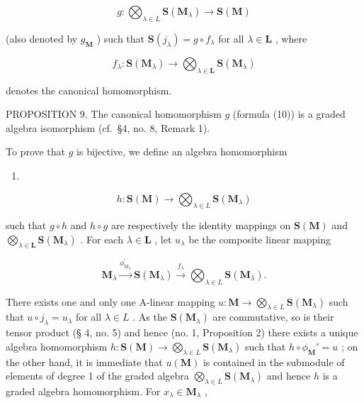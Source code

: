 \[
g \colon \bigotimes_ {\lambda \in L} \mathbf {S} (\mathbf {M} _ {\lambda}) \rightarrow \mathbf {S} (\mathbf {M})\tag{10}
\]

(also denoted by \(g_{\mathbf{M}}\) ) such that \(\mathbf{S}(j_{\lambda}) = g \circ f_{\lambda}\) for all \(\lambda \in \mathbf{L}\) , where

\[
f _ {\lambda} \colon \mathbf {S} (\mathbf {M} _ {\lambda}) \rightarrow \bigotimes_ {\lambda \in \mathbf {L}} \mathbf {S} (\mathbf {M} _ {\lambda})
\]

denotes the canonical homomorphism.

PROPOSITION 9. The canonical homomorphism \(g\) (formula (10)) is a graded algebra isomorphism (cf.~§4, no. 8, Remark 1).

To prove that \(g\) is bijective, we define an algebra homomorphism

\begin{enumerate}
\def\labelenumi{(\arabic{enumi})}
\setcounter{enumi}{10}
\tightlist
\item
\end{enumerate}

\[
h \colon \mathbf {S} (\mathbf {M}) \rightarrow \bigotimes_ {\lambda \in L} \mathbf {S} (\mathbf {M} _ {\lambda})
\]

such that \(g \circ h\) and \(h \circ g\) are respectively the identity mappings on \(\mathbf{S}(\mathbf{M})\) and \(\bigotimes_{\lambda \in \mathbf{L}} \mathbf{S}(\mathbf{M}_{\lambda})\) . For each \(\lambda \in \mathbf{L}\) , let \(u_{\lambda}\) be the composite linear mapping

\[
\mathbf {M} _ {\lambda} \xrightarrow {\phi_ {\mathrm{M} _ {\lambda}} ^ {\prime}} \mathbf {S} (\mathbf {M} _ {\lambda}) \xrightarrow {f _ {\lambda}} \bigotimes_ {\lambda \in L} \mathbf {S} (\mathbf {M} _ {\lambda}).
\]

There exists one and only one A-linear mapping \(u: \mathbf{M} \to \bigotimes_{\lambda \in L} \mathbf{S}(\mathbf{M}_{\lambda})\) such that \(u \circ j_{\lambda} = u_{\lambda}\) for all \(\lambda \in L\) . As the \(\mathbf{S}(\mathbf{M}_{\lambda})\) are commutative, so is their tensor product (§ 4, no. 5) and hence (no. 1, Proposition 2) there exists a unique algebra homomorphism \(h: \mathbf{S}(\mathbf{M}) \to \bigotimes_{\lambda \in L} \mathbf{S}(\mathbf{M}_{\lambda})\) such that \(h \circ \phi_{\mathbf{M}}' = u\) ; on the other hand, it is immediate that \(u(\mathbf{M})\) is contained in the submodule of elements of degree 1 of the graded algebra \(\bigotimes_{\lambda \in L} \mathbf{S}(\mathbf{M}_{\lambda})\) and hence \(h\) is a graded algebra homomorphism. For \(x_{\lambda} \in \mathbf{M}_{\lambda}\) ,

